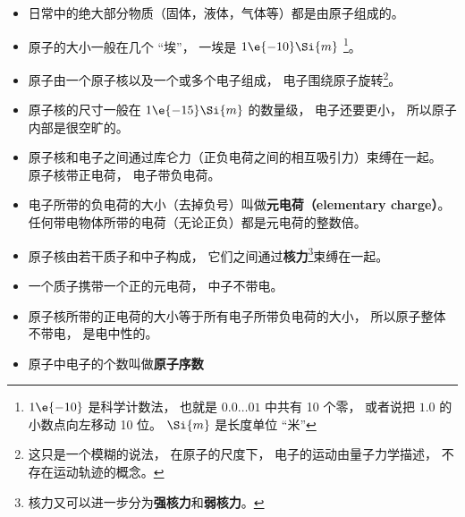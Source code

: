 
\begin{issues}
\issueDraft
\end{issues}

\begin{itemize}
\item 日常中的绝大部分物质（固体，液体，气体等）都是由原子组成的。
\item 原子的大小一般在几个 “埃”， 一埃是 $1\e{-10}\Si{m}$ \footnote{$1\e{-10}$ 是科学计数法， 也就是 $0.0\dots01$ 中共有 10 个零， 或者说把 $1.0$ 的小数点向左移动 10 位。 $\Si{m}$ 是长度单位 “米”}。 %
\item 原子由一个原子核以及一个或多个电子组成， 电子围绕原子旋转\footnote{这只是一个模糊的说法， 在原子的尺度下， 电子的运动由量子力学描述， 不存在运动轨迹的概念。}。
\item 原子核的尺寸一般在 $1\e{-15}\Si{m}$ 的数量级， 电子还要更小， 所以原子内部是很空旷的。
\item 原子核和电子之间通过库仑力（正负电荷之间的相互吸引力）束缚在一起。 原子核带正电荷， 电子带负电荷。 %
\item 电子所带的负电荷的大小（去掉负号）叫做\textbf{元电荷（elementary charge）}。 任何带电物体所带的电荷（无论正负）都是元电荷的整数倍。
\item 原子核由若干质子和中子构成， 它们之间通过\textbf{核力}\footnote{核力又可以进一步分为\textbf{强核力}和\textbf{弱核力}。}束缚在一起。
\item 一个质子携带一个正的元电荷， 中子不带电。
\item 原子核所带的正电荷的大小等于所有电子所带负电荷的大小， 所以原子整体不带电， 是电中性的。
\item 原子中电子的个数叫做\textbf{原子序数}
\end{itemize}
